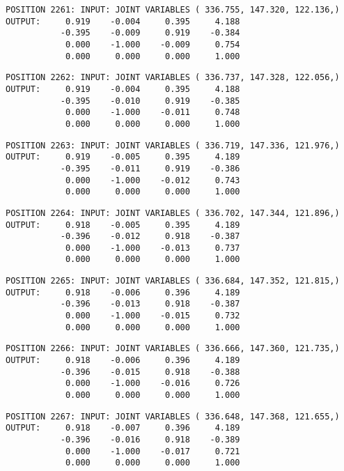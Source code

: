 \begin{verbatim}
POSITION 2261: INPUT: JOINT VARIABLES ( 336.755, 147.320, 122.136,)
OUTPUT:     0.919    -0.004     0.395     4.188
           -0.395    -0.009     0.919    -0.384
            0.000    -1.000    -0.009     0.754
            0.000     0.000     0.000     1.000
\end{verbatim} \pagebreak[1]\begin{verbatim}
POSITION 2262: INPUT: JOINT VARIABLES ( 336.737, 147.328, 122.056,)
OUTPUT:     0.919    -0.004     0.395     4.188
           -0.395    -0.010     0.919    -0.385
            0.000    -1.000    -0.011     0.748
            0.000     0.000     0.000     1.000
\end{verbatim} \pagebreak[1]\begin{verbatim}
POSITION 2263: INPUT: JOINT VARIABLES ( 336.719, 147.336, 121.976,)
OUTPUT:     0.919    -0.005     0.395     4.189
           -0.395    -0.011     0.919    -0.386
            0.000    -1.000    -0.012     0.743
            0.000     0.000     0.000     1.000
\end{verbatim} \pagebreak[1]\begin{verbatim}
POSITION 2264: INPUT: JOINT VARIABLES ( 336.702, 147.344, 121.896,)
OUTPUT:     0.918    -0.005     0.395     4.189
           -0.396    -0.012     0.918    -0.387
            0.000    -1.000    -0.013     0.737
            0.000     0.000     0.000     1.000
\end{verbatim} \pagebreak[1]\begin{verbatim}
POSITION 2265: INPUT: JOINT VARIABLES ( 336.684, 147.352, 121.815,)
OUTPUT:     0.918    -0.006     0.396     4.189
           -0.396    -0.013     0.918    -0.387
            0.000    -1.000    -0.015     0.732
            0.000     0.000     0.000     1.000
\end{verbatim} \pagebreak[1]\begin{verbatim}
POSITION 2266: INPUT: JOINT VARIABLES ( 336.666, 147.360, 121.735,)
OUTPUT:     0.918    -0.006     0.396     4.189
           -0.396    -0.015     0.918    -0.388
            0.000    -1.000    -0.016     0.726
            0.000     0.000     0.000     1.000
\end{verbatim} \pagebreak[1]\begin{verbatim}
POSITION 2267: INPUT: JOINT VARIABLES ( 336.648, 147.368, 121.655,)
OUTPUT:     0.918    -0.007     0.396     4.189
           -0.396    -0.016     0.918    -0.389
            0.000    -1.000    -0.017     0.721
            0.000     0.000     0.000     1.000
\end{verbatim} \pagebreak[1]\begin{verbatim}

\end{verbatim}
